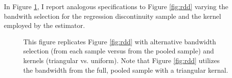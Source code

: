 \documentclass[11pt,english]{article}
\begin{document}
In Figure \ref{fig:rddrobust}, I report analogous specifications to Figure \ref{fig:rdd} varying the bandwith selection for the regression discontinuity sample and the kernel employed by the \citet{calonicoetal2014} estimator. 

\begin{figure}
\caption{This figure replicates Figure \ref{fig:rdd} with alternative bandwidth selection (from each sample versus from the pooled sample) and kernels (triangular vs. uniform). Note that Figure \ref{fig:rdd} utilizes the bandwidth from the full, pooled sample with a triangular kernal.}\label{fig:rddrobust}
\end{figure}

\clearpage
\begin{comment}
\section{Effects of Information Provision}


\subsection{Corruption and electoral performance in the sample}
Table \ref{tab:result4a} replicates \citet{ferrazfinan2008} for the sample of audited municipalities with an incumbent running. Consistent with that paper, electoral performance is decreasing in corruption. Note that this table is intended only to demonstrate that the sign of the association between (endogenous) corruption and vote share is consistent with predictions.
\begin{table}
\centering

\caption{Replication of \citet{ferrazfinan2008} for the audited municipalities with an incumbent running for re-election using the corruption metrics used in this paper.}\label{tab:result4a}
\end{table}


\subsection{Bureaucratic quality and electoral performance of incumbents}
Table \ref{tab:result4b} examines the relationship between bureaucratic quality and re-election. I find modest evidence that incumbents in places with higher levels of bureaucratic quality perform better consistent with the idea that any incumbency disadvantage occurs in lower quantiles of the sample. The difference in vote share is generally better powered than the binary indicator for re-election. 
\begin{table}
\centering

\caption{Bureaucratic quality and electoral performance among municipalities with an incumbent running.}\label{tab:result4b}
\end{table}


\end{comment}
\end{document}
